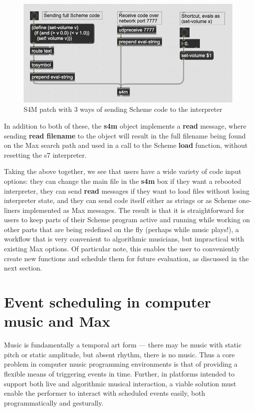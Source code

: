 \documentclass[acmsmall]{acmart}
\begin{document}
\begin{figure}[H]
  \centering
  \includegraphics[width=.75\linewidth]{fig-4-code-sends}
  \caption{S4M patch with 3 ways of sending Scheme code to the interpreter}
\end{figure}


In addition to both of these, the \textbf{s4m} object implements a \textbf{read} message,
where sending \textbf{read filename} to the object will result in the full filename
being found on the Max search path and used in a call to the Scheme \textbf{load} function,
without resetting the s7 interpreter.

Taking the above together, we see that users have a wide variety of code input options:
they can change the main file in the \textbf{s4m} box if they want a rebooted interpreter,
they can send \textbf{read} messages if they want to load files without losing 
interpreter state, and they can send code itself either as strings or as Scheme
one-liners implemented as Max messages. The result is that it is straightforward
for users to keep parts of their Scheme program active and running
while working on other parts that are being redefined on the fly (perhaps while music plays!),
a workflow that is very convenient to algorithmic musicians, but impractical with existing
Max options. Of particular note, this enables the user to
conveniently create new functions and schedule them for future evaluation,
as discussed in the next section.


\section{Event scheduling in computer music and Max}

Music is fundamentally a temporal art form --- there may be music with static pitch
or static amplitude, but absent rhythm, there is no music.  
Thus a core problem in computer music programming environments is that of providing a flexible 
means of triggering events in time. Further, in platforms intended to support both
live and algorithmic musical interaction, a viable solution must enable the performer
to interact with scheduled events easily, both programmatically and gesturally. 
\end{document}
